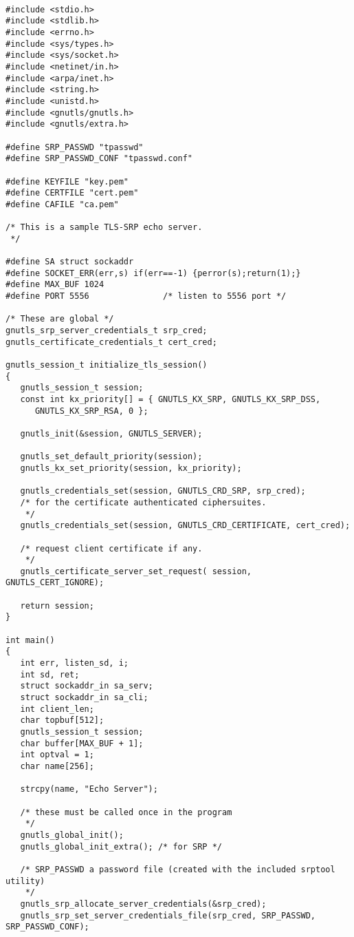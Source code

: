 \begin{verbatim}

#include <stdio.h>
#include <stdlib.h>
#include <errno.h>
#include <sys/types.h>
#include <sys/socket.h>
#include <netinet/in.h>
#include <arpa/inet.h>
#include <string.h>
#include <unistd.h>
#include <gnutls/gnutls.h>
#include <gnutls/extra.h>

#define SRP_PASSWD "tpasswd"
#define SRP_PASSWD_CONF "tpasswd.conf"

#define KEYFILE "key.pem"
#define CERTFILE "cert.pem"
#define CAFILE "ca.pem"

/* This is a sample TLS-SRP echo server.
 */

#define SA struct sockaddr
#define SOCKET_ERR(err,s) if(err==-1) {perror(s);return(1);}
#define MAX_BUF 1024
#define PORT 5556               /* listen to 5556 port */

/* These are global */
gnutls_srp_server_credentials_t srp_cred;
gnutls_certificate_credentials_t cert_cred;

gnutls_session_t initialize_tls_session()
{
   gnutls_session_t session;
   const int kx_priority[] = { GNUTLS_KX_SRP, GNUTLS_KX_SRP_DSS,
      GNUTLS_KX_SRP_RSA, 0 };

   gnutls_init(&session, GNUTLS_SERVER);

   gnutls_set_default_priority(session);
   gnutls_kx_set_priority(session, kx_priority);

   gnutls_credentials_set(session, GNUTLS_CRD_SRP, srp_cred);
   /* for the certificate authenticated ciphersuites.
    */
   gnutls_credentials_set(session, GNUTLS_CRD_CERTIFICATE, cert_cred);

   /* request client certificate if any.
    */
   gnutls_certificate_server_set_request( session, GNUTLS_CERT_IGNORE);

   return session;
}

int main()
{
   int err, listen_sd, i;
   int sd, ret;
   struct sockaddr_in sa_serv;
   struct sockaddr_in sa_cli;
   int client_len;
   char topbuf[512];
   gnutls_session_t session;
   char buffer[MAX_BUF + 1];
   int optval = 1;
   char name[256];

   strcpy(name, "Echo Server");

   /* these must be called once in the program
    */
   gnutls_global_init();
   gnutls_global_init_extra(); /* for SRP */

   /* SRP_PASSWD a password file (created with the included srptool utility) 
    */
   gnutls_srp_allocate_server_credentials(&srp_cred);
   gnutls_srp_set_server_credentials_file(srp_cred, SRP_PASSWD, SRP_PASSWD_CONF);


\end{verbatim}
